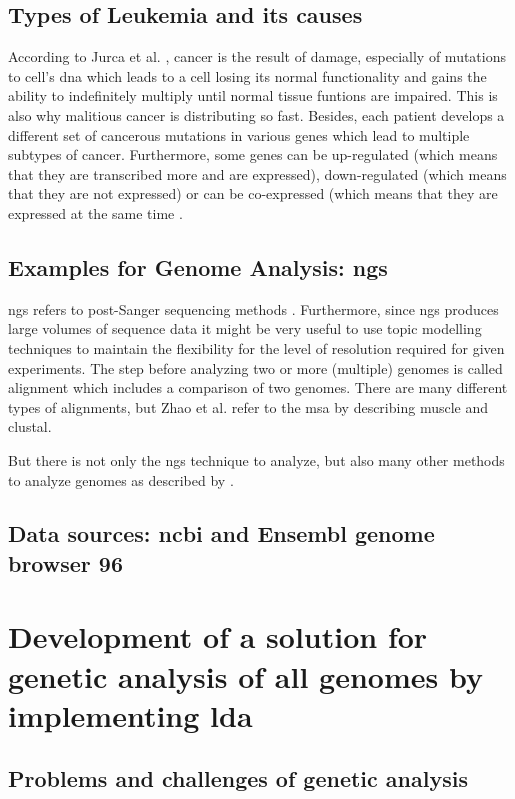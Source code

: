 \section{Types of Leukemia and its causes}\label{leukemia_types}
According to Jurca et al. \autocite{jurca_2016}, cancer is the result of damage, especially of mutations to cell's \gls{dna} which leads to a cell losing its normal functionality and gains the ability to indefinitely multiply until normal tissue funtions are impaired. This is also why malitious cancer is distributing so fast. Besides, each patient develops a different set of cancerous mutations in various genes which lead to multiple subtypes of cancer.
Furthermore, some genes can be up-regulated (which means that they are transcribed more and are expressed), down-regulated (which means that they are not expressed) or can be co-expressed (which means that they are expressed at the same time \autocite{jurca_2016}. 


\section{Examples for Genome Analysis: \gls{ngs}}\label{genome_analysis}
\gls{ngs} refers to post-Sanger sequencing methods \autocite{zhao_2016}. Furthermore, since \gls{ngs} produces large volumes of sequence data it might be very useful to use topic modelling techniques to maintain the flexibility for the level of resolution required for given experiments.  
The step before analyzing two or more (multiple) genomes is called alignment which includes a comparison of two genomes. There are many different types of alignments, but Zhao et al. refer to the \gls{msa} by describing \gls{muscle} and \gls{clustal}.

But there is not only the \gls{ngs} technique to analyze, but also many other methods to analyze genomes as described by \autocite{zhao_2016}. 


\section{Data sources: \gls{ncbi} and Ensembl genome browser 96}\label{datasources}

\chapter{Development of a solution for genetic analysis of \gls{all} genomes by implementing \gls{lda}}\label{development}
\section{Problems and challenges of genetic analysis}\label{problems_challenges}
